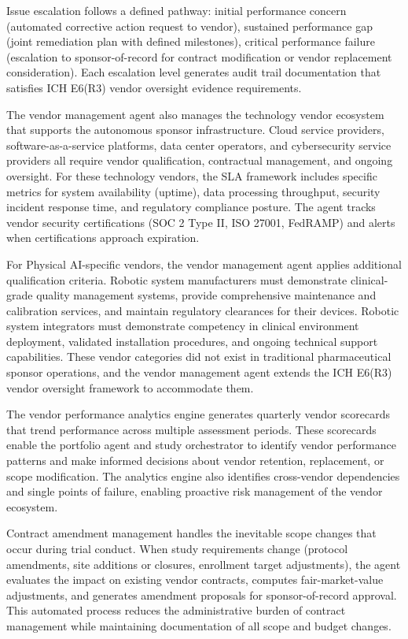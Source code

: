 Issue escalation follows a defined pathway: initial performance concern (automated
corrective action request to vendor), sustained performance gap (joint remediation plan
with defined milestones), critical performance failure (escalation to sponsor-of-record
for contract modification or vendor replacement consideration). Each escalation level
generates audit trail documentation that satisfies ICH E6(R3) vendor oversight evidence
requirements.

The vendor management agent also manages the technology vendor ecosystem that supports the
autonomous sponsor infrastructure. Cloud service providers, software-as-a-service platforms,
data center operators, and cybersecurity service providers all require vendor qualification,
contractual management, and ongoing oversight. For these technology vendors, the SLA framework
includes specific metrics for system availability (uptime), data processing throughput,
security incident response time, and regulatory compliance posture. The agent tracks vendor
security certifications (SOC 2 Type II, ISO 27001, FedRAMP) and alerts when certifications
approach expiration.

For Physical AI-specific vendors, the vendor management agent applies additional qualification
criteria. Robotic system manufacturers must demonstrate clinical-grade quality management
systems, provide comprehensive maintenance and calibration services, and maintain regulatory
clearances for their devices. Robotic system integrators must demonstrate competency in
clinical environment deployment, validated installation procedures, and ongoing technical
support capabilities. These vendor categories did not exist in traditional pharmaceutical
sponsor operations, and the vendor management agent extends the ICH E6(R3) vendor oversight
framework to accommodate them.

The vendor performance analytics engine generates quarterly vendor scorecards that trend
performance across multiple assessment periods. These scorecards enable the portfolio agent
and study orchestrator to identify vendor performance patterns and make informed decisions
about vendor retention, replacement, or scope modification. The analytics engine also
identifies cross-vendor dependencies and single points of failure, enabling proactive risk
management of the vendor ecosystem.

Contract amendment management handles the inevitable scope changes that occur during
trial conduct. When study requirements change (protocol amendments, site additions or
closures, enrollment target adjustments), the agent evaluates the impact on existing
vendor contracts, computes fair-market-value adjustments, and generates amendment
proposals for sponsor-of-record approval. This automated process reduces the
administrative burden of contract management while maintaining documentation of all
scope and budget changes.
